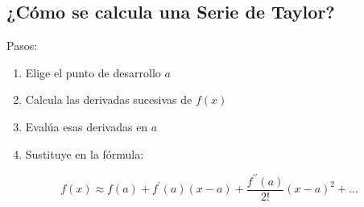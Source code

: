 \documentclass[12pt, a4paper, oneside]{article}
\begin{document}
\subsection{¿Cómo se calcula una Serie de Taylor?}
Pasos:
\begin{enumerate}
  \item Elige el punto de desarrollo $a$
  \item Calcula las derivadas sucesivas de $f(x)$
  \item Evalúa esas derivadas en $a$
  \item Sustituye en la fórmula:
\end{enumerate}
\begingroup
\Large
\begin{equation*}
  f(x) \approx f(a) + f^\prime(a)(x-a) + \frac{f^{\prime\prime}(a)}{2!}(x-a)^2 + ...
\end{equation*}
\endgroup
\end{document}
